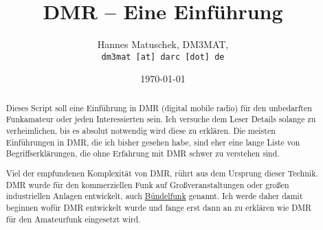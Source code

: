 \documentclass[11pt, a4paper,parskip=half]{scrartcl}
\title{DMR -- Eine Einführung}
\author{Hannes Matuschek, DM3MAT,\\\texttt{dm3mat [at] darc [dot] de}}
\date{\today}
\begin{document}
\begin{titlepage}
 \maketitle
 \begin{abstract}
  Dieses Script soll eine Einführung in DMR (digital mobile radio) für den 
  unbedarften Funkamateur oder jeden Interessierten sein. Ich versuche dem 
  Leser Details solange zu verheimlichen, bis es absolut notwendig wird 
  diese zu erklären. Die meisten
  Einführungen in DMR, die ich bisher gesehen habe, sind eher eine lange Liste
  von Begriffserklärungen, die ohne Erfahrung mit DMR schwer zu verstehen sind. 
  
  Viel der empfundenen Komplexität von DMR, rührt aus dem Ursprung dieser 
  Technik. DMR wurde für den kommerziellen Funk auf Großveranstaltungen oder 
  großen industriellen Anlagen entwickelt, auch 
  \href{https://de.wikipedia.org/wiki/B\%C3\%BCndelfunk}{Bündelfunk} genannt. 
  Ich werde daher damit beginnen wofür DMR entwickelt wurde und fange erst dann
  an zu erklären wie DMR für den Amateurfunk eingesetzt wird.
 \end{abstract}
 \vfill
 \tableofcontents
\end{titlepage}







	

















\appendix
\printindex
\end{document}
